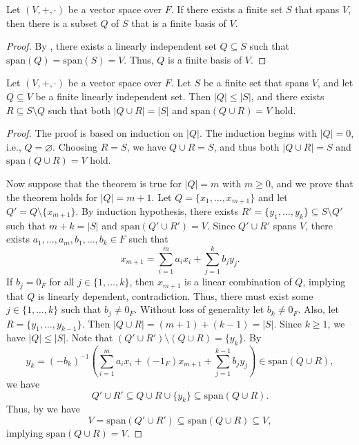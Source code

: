 \begin{theorem}\label{thm:finite-basis-existence}
  Let $(V, +, \cdot)$ be a vector space over $F$.
  If there exists a finite set $S$ that spans $V$, then there is a subset
  $Q$ of $S$ that is a finite basis of $V$.
\end{theorem}
\begin{proof}
  By , there exists
  a linearly independent set $Q \subseteq S$
  such that $\mathrm{span}(Q) = \mathrm{span}(S) = V$.
  Thus, $Q$ is a finite basis of $V$.
\end{proof}

\begin{theorem}\label{thm:replacement}
  Let $(V, +, \cdot)$ be a vector space over $F$.
  Let $S$ be a finite set that spans $V$,
  and let $Q \subseteq V$ be a finite linearly independent set.
  Then $|Q| \leq |S|$, and there exists $R \subseteq S \setminus Q$ such that
  both $|Q \cup R| = |S|$ and $\mathrm{span}(Q \cup R) = V$ hold.
\end{theorem}
\begin{proof}
  The proof is based on induction on $|Q|$.
  The induction begins with $|Q| = 0$, i.e., $Q = \varnothing$.
  Choosing $R = S$, we have $Q \cup R = S$, and thus
  both $|Q \cup R| = S$ and $\mathrm{span}(Q \cup R) = V$ hold.

  Now suppose that the theorem is true for $|Q| = m$ with $m \geq 0$,
  and we prove that the theorem holds for $|Q|= m + 1$.
  Let $Q = \{x_1, \dots, x_{m+1}\}$ and let $Q' = Q \setminus \{x_{m+1}\}$.
  By induction hypothesis, there exists
  $R' = \{y_1, \dots, y_k\} \subseteq S \setminus Q'$
  such that $m + k = |S|$ and $\mathrm{span}(Q' \cup R') = V$.
  Since $Q' \cup R'$ spans $V$, there exists
  $a_1, \dots, a_m, b_1, \dots, b_k \in F$ such that
  \begin{equation*}
    x_{m+1} = \sum_{i=1}^m a_ix_i + \sum_{j=1}^k b_jy_j.
  \end{equation*}
  If $b_j = 0_F$ for all $j \in \{1, \dots, k\}$, then $x_{m+1}$ is a linear
  combination of $Q$, implying that $Q$ is linearly dependent, contradiction.
  Thus, there must exist some $j \in \{1, \dots, k\}$
  such that $b_j \neq 0_F$.
  Without loss of generality let $b_k \neq 0_F$.
  Also, let $R = \{y_1, \dots, y_{k-1}\}$.
  Then $|Q \cup R| = (m+1) + (k-1) = |S|$.
  Since $k \geq 1$, we have $|Q| \leq |S|$.
  Note that $(Q' \cup R') \setminus (Q \cup R) = \{y_k\}$.
  By
  \begin{equation*}
    y_k = (-b_k)^{-1}\left(
       \sum_{i=1}^m a_ix_i + (-1_F)x_{m+1} + \sum_{j=1}^{k-1} b_jy_j
    \right) \in \mathrm{span}(Q \cup R),
  \end{equation*}
  we have
  \begin{equation*}
    Q' \cup R'
      \subseteq Q \cup R \cup \{y_k\}
      \subseteq \mathrm{span}(Q \cup R).
  \end{equation*}
  Thus, by  we have
  \begin{equation*}
    V = \mathrm{span}(Q' \cup R')
      \subseteq \mathrm{span}(Q \cup R)
      \subseteq V,
  \end{equation*}
  implying $\mathrm{span}(Q \cup R) = V$.
\end{proof}

